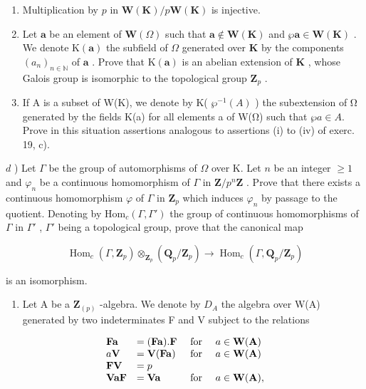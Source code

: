 \begin{enumerate}
\def\labelenumi{\alph{enumi})}
\item
  Multiplication by \(p\) in \(\mathbf{W}(\mathbf{K}) / p\mathbf{W}(\mathbf{K})\) is injective.
\item
  Let \(\pmb{a}\) be an element of \(\mathbf{W}(\Omega)\) such that \(\pmb{a} \notin \mathbf{W}(\mathbf{K})\) and \(\wp \pmb{a} \in \mathbf{W}(\mathbf{K})\) . We denote \(\mathrm{K}(\pmb{a})\) the subfield of \(\Omega\) generated over \(\mathbf{K}\) by the components \((a_n)_{n \in \mathbb{N}}\) of \(\pmb{a}\) . Prove that \(\mathrm{K}(\pmb{a})\) is an abelian extension of \(\mathbf{K}\) , whose Galois group is isomorphic to the topological group \(\mathbf{Z}_p\) .
\item
  If A is a subset of W(K), we denote by K( \(\wp^{-1}(A)\) ) the subextension of Ω generated by the fields K(a) for all elements a of W(Ω) such that \(\wp a \in A\). Prove in this situation assertions analogous to assertions (i) to (iv) of exerc. 19, c).
\end{enumerate}

\(d\) ) Let \(\Gamma\) be the group of automorphisms of \(\Omega\) over K. Let \(n\) be an integer \(\geqslant 1\) and \(\varphi_{n}\) be a continuous homomorphism of \(\Gamma\) in \(\mathbf{Z} / p^{n}\mathbf{Z}\) . Prove that there exists a continuous homomorphism \(\varphi\) of \(\Gamma\) in \(\mathbf{Z}_{p}\) which induces \(\varphi_{n}\) by passage to the quotient. Denoting by \(\mathrm{Hom}_c(\Gamma, \Gamma')\) the group of continuous homomorphisms of \(\Gamma\) in \(\Gamma'\) , \(\Gamma'\) being a topological group, prove that the canonical map

\[
\operatorname{Hom} _ {c} (\Gamma , \mathbf {Z} _ {p}) \otimes_ {\mathbf {Z} _ {p}} (\mathbf {Q} _ {p} / \mathbf {Z} _ {p}) \rightarrow \operatorname{Hom} _ {c} (\Gamma , \mathbf {Q} _ {p} / \mathbf {Z} _ {p})
\]

is an isomorphism.

\begin{enumerate}
\def\labelenumi{\arabic{enumi})}
\setcounter{enumi}{21}
\tightlist
\item
  Let A be a \(\mathbf{Z}_{(p)}\) -algebra. We denote by \(D_{A}\) the algebra over W(A) generated by two indeterminates F and V subject to the relations
\end{enumerate}

\[
\begin{array}{l l l l} \mathbf {F a} & = (\mathbf {F a}). \mathbf {F} & \text { for } & a \in \mathbf {W} (\mathbf {A}) \\ a \mathbf {V} & = \mathbf {V} (\mathbf {F a}) & \text { for } & a \in \mathbf {W} (\mathbf {A}) \\ \mathbf {F V} & = p & & \\ \mathbf {V a F} & = \mathbf {V a} & \text { for } & a \in \mathbf {W} (\mathbf {A}), \end{array}
\]

